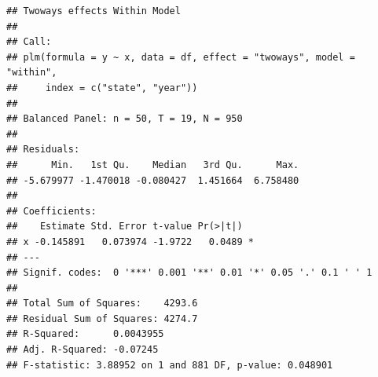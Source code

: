 \documentclass[]{book}
\theoremstyle{definition}
\theoremstyle{definition}
\theoremstyle{definition}
\theoremstyle{remark}
\begin{document}
\begin{verbatim}
## Twoways effects Within Model
## 
## Call:
## plm(formula = y ~ x, data = df, effect = "twoways", model = "within", 
##     index = c("state", "year"))
## 
## Balanced Panel: n = 50, T = 19, N = 950
## 
## Residuals:
##      Min.   1st Qu.    Median   3rd Qu.      Max. 
## -5.679977 -1.470018 -0.080427  1.451664  6.758480 
## 
## Coefficients:
##    Estimate Std. Error t-value Pr(>|t|)  
## x -0.145891   0.073974 -1.9722   0.0489 *
## ---
## Signif. codes:  0 '***' 0.001 '**' 0.01 '*' 0.05 '.' 0.1 ' ' 1
## 
## Total Sum of Squares:    4293.6
## Residual Sum of Squares: 4274.7
## R-Squared:      0.0043955
## Adj. R-Squared: -0.07245
## F-statistic: 3.88952 on 1 and 881 DF, p-value: 0.048901
\end{verbatim}


\end{document}
